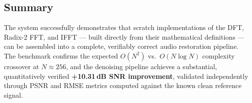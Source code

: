 \documentclass[11pt]{article}
\begin{document}
\subsection{Summary}

The system successfully demonstrates that scratch implementations of the
DFT, Radix-2 FFT, and IFFT --- built directly from their mathematical
definitions --- can be assembled into a complete, verifiably correct audio
restoration pipeline. The benchmark confirms the expected $O(N^2)$ vs.\
$O(N\log N)$ complexity crossover at $N \approx 256$, and the denoising
pipeline achieves a substantial, quantitatively verified
\textbf{+10.31\,dB SNR improvement}, validated independently through PSNR
and RMSE metrics computed against the known clean reference signal.
\end{document}
